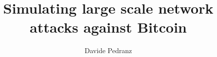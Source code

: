 \usepackage[utf8]{inputenc}
\usepackage[american]{babel}

\usepackage{csquotes}
\usepackage[style=trad-plain]{biblatex}


\usepackage[hidelinks, pdfusetitle]{hyperref}
\renewcommand{\UrlFont}{\small\tt}

\usepackage[group-separator={,}]{siunitx}

\usepackage{graphicx}
\usepackage{subcaption}
\usepackage{float}

\usepackage{booktabs}

\usepackage[bottom]{footmisc}
\usepackage{chngcntr}

\usepackage{textcomp}

\usepackage{setspace}
\usepackage[algoruled]{algorithm2e}

\usepackage[noabbrev,capitalise]{cleveref}

\usepackage{setspace}

\RequirePackage[index=true]{acro}
\NewDocumentCommand{}
\NewDocumentCommand{}

\title{Simulating large scale network attacks against Bitcoin}
\author{Davide Pedranz}




\tableofcontents
\listoffigures







\printbibliography

